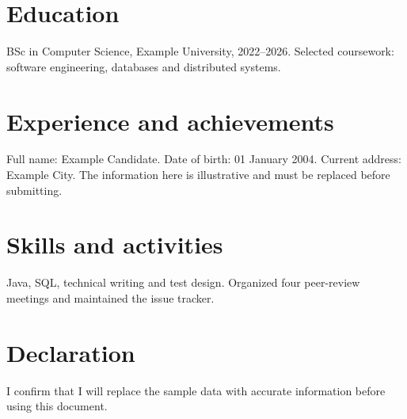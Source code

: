\section{Education}
BSc in Computer Science, Example University, 2022--2026. Selected coursework: software engineering, databases and distributed systems.

\section{Experience and achievements}
Full name: Example Candidate. Date of birth: 01 January 2004. Current address: Example City. The information here is illustrative and must be replaced before submitting.

\section{Skills and activities}
Java, SQL, technical writing and test design. Organized four peer-review meetings and maintained the issue tracker.

\section{Declaration}
I confirm that I will replace the sample data with accurate information before using this document.

